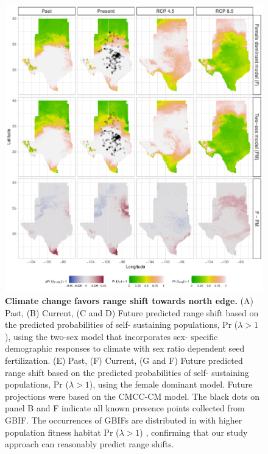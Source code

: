 \documentclass[12pt]{article}\usepackage[]{graphicx}\usepackage[dvipsnames]{xcolor}
\begin{document}
\begin{figure}[H]
	\begin{center}
		\includegraphics[width=0.99\linewidth]{Figures/Fig_geoPrlambdacmc.pdf}
		\caption{ \textbf{Climate change favors range shift towards north edge.}
			(A) Past, (B) Current, (C and D) Future predicted range shift based on the predicted probabilities of self- sustaining populations, Pr ($\lambda > 1$), using the two-sex model that incorporates sex- specific demographic responses to climate with sex ratio dependent seed fertilization.
			(E) Past, (F) Current, (G and F) Future  predicted range shift based on the predicted probabilities of self- sustaining populations, Pr ($\lambda > 1$), using the female dominant model.
			Future projections were based on the CMCC-CM model.
			The black dots on panel B and F indicate all known presence points collected from GBIF. 
			The occurrences of GBIFs are distributed in with higher population fitness habitat Pr ($\lambda > 1$) , confirming that our study approach can reasonably predict range shifts. }
		\label{fig:geoprojcmc}
	\end{center}
\end{figure}
\end{document}
